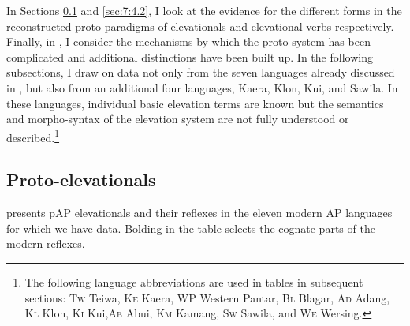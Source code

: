 In Sections \ref{sec:7:4.1} and \ref{sec:7:4.2}, I look at the evidence for the different forms in the reconstructed proto-paradigms of elevationals  and elevational verbs respectively. Finally, in , I consider the mechanisms by which the proto-system has been complicated and additional distinctions have been built up. In the following subsections, I draw on data not only from the seven languages already discussed in , but also from an additional four languages, Kaera, Klon, Kui, and Sawila. In these languages, individual basic elevation terms are known but the semantics and morpho-syntax of the elevation system are not fully understood or described.\footnote{The following language abbreviations are used in tables in subsequent sections: \textsc{Tw} Teiwa, \textsc{Ke} Kaera, \textsc{WP} Western Pantar, \textsc{Bl} Blagar, \textsc{Ad} Adang, \textsc{Kl} Klon, \textsc{Ki} Kui,\textsc{Ab}  Abui, \textsc{Km} Kamang, \textsc{Sw} Sawila, and \textsc{We} Wersing.} 

\subsection{Proto-elevationals}\label{sec:7:4.1}
 presents pAP elevationals and their reflexes in the eleven modern AP languages for which we have data. Bolding in the table selects the cognate parts of the modern reflexes.

\enlargethispage{-3em}
 


